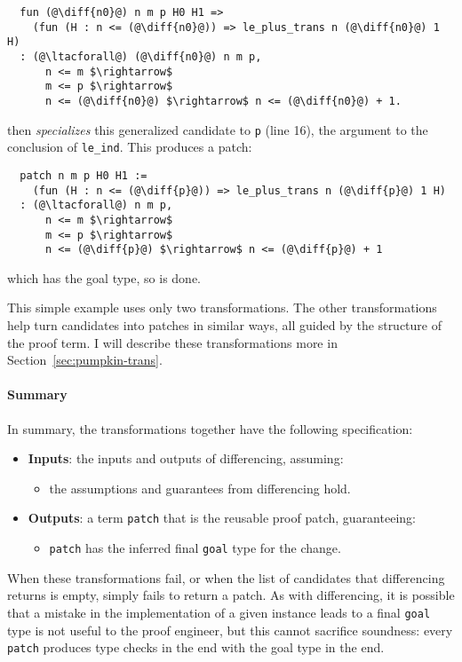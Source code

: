 \begin{lstlisting}
  fun (@\diff{n0}@) n m p H0 H1 =>
    (fun (H : n <= (@\diff{n0}@)) => le_plus_trans n (@\diff{n0}@) 1 H)
  : (@\ltacforall@) (@\diff{n0}@) n m p,
      n <= m $\rightarrow$
      m <= p $\rightarrow$
      n <= (@\diff{n0}@) $\rightarrow$ n <= (@\diff{n0}@) + 1.
\end{lstlisting}
\sysname then \textit{specializes} this generalized candidate to \lstinline{p} (line 16), the argument
to the conclusion of \lstinline{le_ind}. This produces a patch:

\begin{lstlisting}
  patch n m p H0 H1 :=
    (fun (H : n <= (@\diff{p}@)) => le_plus_trans n (@\diff{p}@) 1 H)
  : (@\ltacforall@) n m p,
      n <= m $\rightarrow$
      m <= p $\rightarrow$
      n <= (@\diff{p}@) $\rightarrow$ n <= (@\diff{p}@) + 1
\end{lstlisting}
which has the goal type, so \sysname is done.

This simple example uses only two transformations.
The other transformations help turn candidates into patches in similar ways, all guided by
the structure of the proof term.
I will describe these transformations more in Section~\ref{sec:pumpkin-trans}.

\paragraph{Summary}
In summary, the transformations together have the following specification:

\begin{itemize}
\item \textbf{Inputs}: the inputs and outputs of differencing, assuming:
\begin{itemize}
\item the assumptions and guarantees from differencing hold.
\end{itemize}
\item \textbf{Outputs}: a term \lstinline{patch} that is the reusable proof patch, guaranteeing:
\begin{itemize}
\item \lstinline{patch} has the inferred final \lstinline{goal} type for the change.
\end{itemize}
\end{itemize}
When these transformations fail, or when the list of candidates that differencing returns is empty,
\sysname simply fails to return a patch.
As with differencing, it is possible that a mistake in the implementation of a given instance
leads to a final \lstinline{goal} type is not useful to the proof engineer,
but this cannot sacrifice soundness:
every \lstinline{patch} \sysname produces type checks in the end with the goal type in the end.

